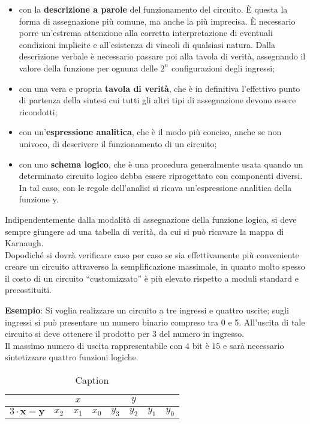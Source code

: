 \documentclass[a4paper]{extarticle}
\newcommand{\quotes}[1]{``#1''}
\begin{document}
\begin{itemize}
    \item con la \textbf{descrizione a parole} del funzionamento del circuito. È questa la forma di assegnazione più comune, ma anche la più imprecisa. È necessario porre un’estrema attenzione alla corretta interpretazione di eventuali condizioni implicite e all’esistenza di vincoli di qualsiasi natura. Dalla descrizione verbale è necessario passare poi alla tavola di verità, assegnando il valore della funzione per ognuna delle \(2^n\) configurazioni degli ingressi;

    \item con una vera e propria \textbf{tavola di verità}, che è in definitiva l’effettivo punto di partenza della sintesi cui tutti gli altri tipi di assegnazione devono essere ricondotti;

    \item con un’\textbf{espressione analitica}, che è il modo più conciso, anche se non univoco, di descrivere il funzionamento di un circuito;

    \item con uno \textbf{schema logico}, che è una procedura generalmente usata quando un determinato circuito logico debba essere riprogettato con componenti diversi. In tal caso, con le regole dell’analisi si ricava un’espressione analitica della funzione y.
\end{itemize}

\noindent
Indipendentemente dalla modalità di assegnazione della funzione logica, si deve sempre giungere ad una tabella di verità, da cui si può ricavare la mappa di Karnaugh.\\
Dopodiché si dovrà verificare caso per caso se sia effettivamente più conveniente creare un circuito attraverso la semplificazione massimale, in quanto molto spesso il costo di un circuito \quotes{customizzato} è più elevato rispetto a moduli standard e precostituiti.

\vspace{1em}
\noindent
\textbf{Esempio}: Si voglia realizzare un circuito a tre ingressi e quattro uscite; sugli ingressi si può presentare un numero binario compreso tra 0 e 5. All’uscita di tale circuito si deve ottenere il prodotto per \(3\) del numero in ingresso.\\
Il massimo numero di uscita rappresentabile con \(4\) bit è \(15\) e sarà necessario sintetizzare quattro funzioni logiche.

\begin{table}[H]
    \centering
    \setlength{\tabcolsep}{8pt}
    \begin{tabular}{l||ccc|cccc}
         & & \textbf{\(x\)} & & & \textbf{\(y\)} &\\
         \hline
         \(3 \cdot \textbf{x} = \textbf{y}\) & \(x_2\) & \(x_1\) & \(x_0\) & \(y_3\) & \(y_2\) & \(y_1\) & \(y_0\)\\
         \hline
    \end{tabular}
    \caption{Caption}
    \label{tab:my_label}
\end{table}
\end{document}

